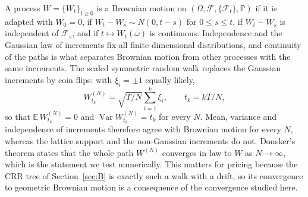 A process $W=\{W_t\}_{t\ge0}$ is a Brownian motion on $(\Omega,\mathcal F,\{\mathcal F_t\},\mathbb P)$ if it is adapted with $W_0=0$, if $W_t-W_s\sim N(0,t-s)$ for $0\le s\le t$, if $W_t-W_s$ is independent of $\mathcal F_s$, and if $t\mapsto W_t(\omega)$ is continuous.
Independence and the Gaussian law of increments fix all finite-dimensional distributions, and continuity of the paths is what separates Brownian motion from other processes with the same increments.
The scaled symmetric random walk replaces the Gaussian increments by coin flips: with $\xi_i=\pm1$ equally likely,
\begin{equation}\label{eq:scaledwalk}
 W^{(N)}_{t_k}=\sqrt{T/N}\sum_{i=1}^{k}\xi_i,\qquad t_k=kT/N,
\end{equation}
so that $\mathbb E\,W^{(N)}_{t_k}=0$ and $\operatorname{Var}W^{(N)}_{t_k}=t_k$ for every $N$.
Mean, variance and independence of increments therefore agree with Brownian motion for every $N$, whereas the lattice support and the non-Gaussian increments do not.
Donsker's theorem states that the whole path $W^{(N)}$ converges in law to $W$ as $N\to\infty$, which is the statement we test numerically.
This matters for pricing because the CRR tree of Section~\ref{sec:B} is exactly such a walk with a drift, so its convergence to geometric Brownian motion is a consequence of the convergence studied here.

